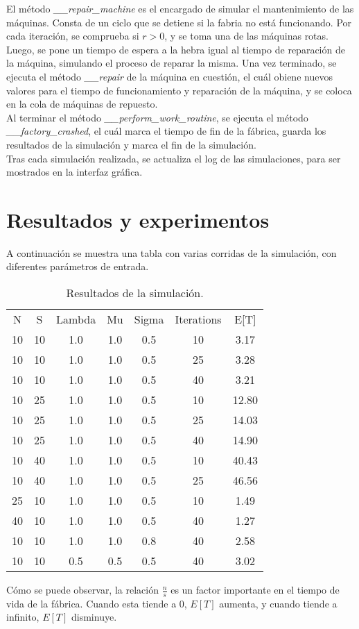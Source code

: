 \documentclass{article}
\begin{document}
El método \textit{\_\_repair\_machine} es el encargado de simular el mantenimiento de las máquinas. Consta de un ciclo que se detiene si la fabria no está funcionando. Por cada iteración, se comprueba si $r>0$, y se toma una de las máquinas rotas. Luego, se pone un tiempo de espera a la hebra igual al tiempo de reparación de la máquina, simulando el proceso de reparar la misma. Una vez terminado, se ejecuta el método \textit{\_\_repair} de la máquina en cuestión, el cuál obiene nuevos valores para el tiempo de funcionamiento y reparación de la máquina, y se coloca en la cola de máquinas de repuesto.\\

Al terminar el método \textit{\_\_perform\_work\_routine}, se ejecuta el método \textit{\_\_factory\_crashed}, el cuál marca el tiempo de fin de la fábrica, guarda los resultados de la simulación y marca el fin de la simulación.\\

Tras cada simulación realizada, se actualiza el log de las simulaciones, para ser mostrados en la interfaz gráfica.

\section{Resultados y experimentos}

A continuación se muestra una tabla con varias corridas de la simulación, con diferentes parámetros de entrada.


\begin{table}[htbp]
    \centering
    \caption{Resultados de la simulación.}
    \begin{tabular}{ccccccc}
        N & S & Lambda & Mu & Sigma & Iterations & E[T] \\
        10 & 10 & 1.0 & 1.0 & 0.5 & 10 & 3.17 \\
        10 & 10 & 1.0 & 1.0 & 0.5 & 25 & 3.28 \\
        10 & 10 & 1.0 & 1.0 & 0.5 & 40 & 3.21 \\
        10 & 25 & 1.0 & 1.0 & 0.5 & 10 & 12.80 \\
        10 & 25 & 1.0 & 1.0 & 0.5 & 25 & 14.03 \\
        10 & 25 & 1.0 & 1.0 & 0.5 & 40 & 14.90 \\
        10 & 40 & 1.0 & 1.0 & 0.5 & 10 & 40.43 \\
        10 & 40 & 1.0 & 1.0 & 0.5 & 25 & 46.56 \\
        25 & 10 & 1.0 & 1.0 & 0.5 & 10 & 1.49 \\
        40 & 10 & 1.0 & 1.0 & 0.5 & 40 & 1.27 \\
        10 & 10 & 1.0 & 1.0 & 0.8 & 40 & 2.58 \\
        10 & 10 & 0.5 & 0.5 & 0.5 & 40 & 3.02 \\
    \end{tabular}
    \label{tab:experiments_table}
\end{table}

Cómo se puede observar, la relación $\frac{n}{s}$ es un factor importante en el tiempo de vida de la fábrica. Cuando esta tiende a 0, $E[T]$ aumenta, y cuando tiende a infinito, $E[T]$ disminuye.\\
\end{document}
